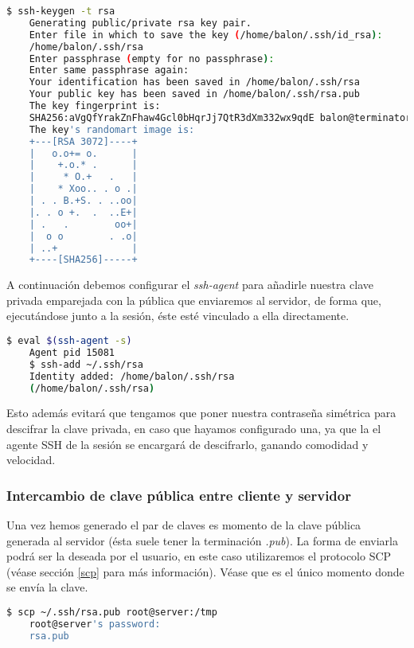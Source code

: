 \documentclass[a4paper, 11pt, titlepage]{article}
\begin{document}
        \begin{lstlisting}[language=bash,basicstyle=\scriptsize]
    $ ssh-keygen -t rsa
    Generating public/private rsa key pair.
    Enter file in which to save the key (/home/balon/.ssh/id_rsa): 
    /home/balon/.ssh/rsa
    Enter passphrase (empty for no passphrase): 
    Enter same passphrase again: 
    Your identification has been saved in /home/balon/.ssh/rsa
    Your public key has been saved in /home/balon/.ssh/rsa.pub
    The key fingerprint is:
    SHA256:aVgQfYrakZnFhaw4Gcl0bHqrJj7QtR3dXm332wx9qdE balon@terminator
    The key's randomart image is:
    +---[RSA 3072]----+
    |   o.o+= o.      |
    |    +.o.* .      |
    |     * O.+   .   |
    |    * Xoo.. . o .|
    | . . B.+S. . ..oo|
    |. . o +.  .  ..E+|
    | .   .        oo+|
    |  o o        . .o|
    | ..+             |
    +----[SHA256]-----+\end{lstlisting}

        A continuación debemos configurar el \textit{ssh-agent} para añadirle nuestra 
        clave privada emparejada con la pública que enviaremos al servidor, de forma que,
        ejecutándose junto a la sesión, éste esté vinculado a ella directamente.

        \begin{lstlisting}[language=bash,basicstyle=\small]
    $ eval $(ssh-agent -s)
    Agent pid 15081
    $ ssh-add ~/.ssh/rsa
    Identity added: /home/balon/.ssh/rsa 
    (/home/balon/.ssh/rsa) \end{lstlisting}

        Esto además evitará que tengamos que poner nuestra contraseña simétrica 
        para descifrar la clave privada, en caso que hayamos configurado una, ya que la 
        el agente SSH de la sesión se encargará de descifrarlo, ganando comodidad y velocidad.

        \subsubsection{Intercambio de clave pública entre cliente y servidor} Una vez hemos 
        generado el par de claves es momento de la clave pública generada al servidor 
        (ésta suele tener la terminación \textit{.pub}). La forma de enviarla podrá ser 
        la deseada por el usuario, en este caso utilizaremos el protocolo SCP (véase 
        sección \ref{scp} para más información). Véase que es el único momento donde se 
        envía la clave.
        
        \begin{lstlisting}[language=bash]
    $ scp ~/.ssh/rsa.pub root@server:/tmp
    root@server's password:
    rsa.pub \end{lstlisting}
\end{document}
